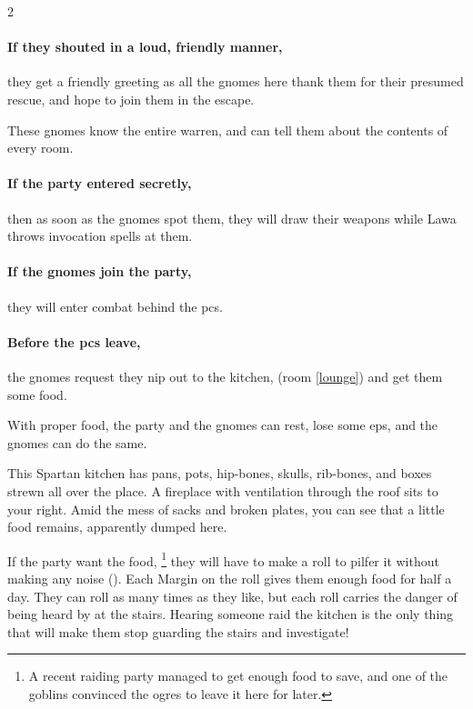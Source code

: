 \begin{multicols}{2}
\paragraph{If they shouted in a loud, friendly manner,}
they get a friendly greeting as all the gnomes here thank them for their presumed rescue, and hope to join them in the escape.

These gnomes know the entire \gls{warren}, and can tell them about the contents of every room.

\paragraph{If the party entered secretly,}
then as soon as the gnomes spot them, they will draw their weapons while Lawa throws invocation spells at them.

\paragraph{If the gnomes join the party,}
they will enter combat behind the \glspl{pc}.

\paragraph{Before the \glspl{pc} leave,}
the gnomes request they nip out to the kitchen, (room \ref{lounge}) and get them some food.

With proper food, the party and the gnomes can rest, lose some \glspl{ep}, and the gnomes can do the same.


\showStdSpells



\Yan


\begin{boxtext}
  This Spartan kitchen has pans, pots, hip-bones, skulls, rib-bones, and boxes strewn all over the place.
  A fireplace with ventilation through the roof sits to your right.
  Amid the mess of sacks and broken plates, you can see that a little food remains, apparently dumped here.
\end{boxtext}


If the party want the food,%
\footnote{A recent raiding party managed to get enough food to save, and one of the goblins convinced the \glspl{ogre} to leave it here for later.}
they will have to make a  roll to pilfer it without making any noise (\tn[8]).
Each Margin on the roll gives them enough food for half a day.
They can roll as many times as they like, but each roll carries the danger of being heard by  at the stairs.
Hearing someone raid the kitchen is the only thing that will make them stop guarding the stairs and investigate!


\end{multicols}

